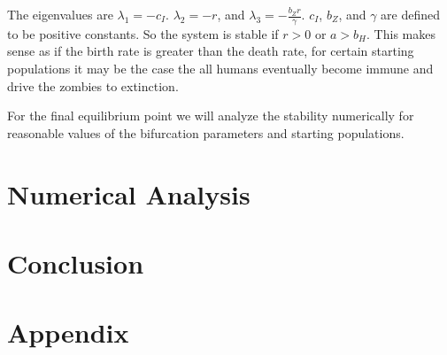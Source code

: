 \documentclass[
	12pt
]{article}
\begin{document}
The eigenvalues are $\lambda_1=-c_I$. $\lambda_2=-r$, and $\lambda_3=-\frac{b_Z r}{\gamma}$. $c_I$, $b_Z$, and $\gamma$ are defined to be positive constants. So the system is stable if $r>0$ or $a>b_H$. This makes sense as if the birth rate is greater than the death rate, for certain starting populations it may be the case the all humans eventually become immune and drive the zombies to extinction.

For the final equilibrium point we will analyze the stability numerically for reasonable values of the bifurcation parameters and starting populations.

\section{Numerical Analysis}

\section{Conclusion}

\section{Appendix}
\end{document}
